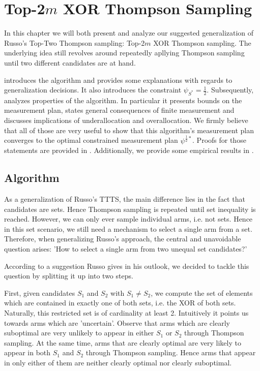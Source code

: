 \chapter{Top-2$m$ XOR Thompson Sampling}

In this chapter we will both present and analyze our suggested generalization of Russo's Top-Two Thompson sampling: Top-2$m$ XOR Thompson sampling. The underlying idea still revolves around repeatedly apllying Thompson sampling until two different candidates are at hand.

 introduces the algorithm and provides some explanations with regards to generalization decisions. It also introduces the constraint $\psi_{S^*} = \frac{1}{2}$. Subsequently,  analyzes properties of the algorithm. In particular it presents bounds on the measurement plan, states general consequences of finite measurement and discusses implications of underallocation and overallocation. We firmly believe that all of those are very useful to show that this algorithm's measurement plan converges to the optimal constrained measurement plan $\psi^{\frac{1}{2}*}$. Proofs for those statements are provided in . Additionally, we provide some empirical results in .

\section{Algorithm}\label{section:algorithm}
As a generalization of Russo's TTTS, the main difference lies in the fact that candidates are sets. Hence Thompson sampling is repeated until set inequality is reached. However, we can only ever sample individual arms, i.e. not sets. Hence in this set scenario, we still need a mechanism to select a single arm from a set. Therefore, when generalizing Russo's approach, the central and unavoidable question arises: 'How to select a single arm from two unequal set candidates?'

According to a suggestion Russo gives in his outlook, we decided to tackle this question by splitting it up into two steps.

First, given candidates $S_1$ and $S_2$ with $S_1 \neq S_2$, we compute the set of elements which are contained in exactly one of both sets, i.e. the XOR of both sets. Naturally, this restricted set is of cardinality at least 2. Intuitively it points us towards arms which are 'uncertain'. Observe that arms which are clearly suboptimal are very unlikely to appear in either $S_1$ or $S_2$ through Thompson sampling. At the same time, arms that are clearly optimal are very likely to appear in both $S_1$ and $S_2$ through Thompson sampling. Hence arms that appear in only either of them are neither clearly optimal nor clearly suboptimal.

